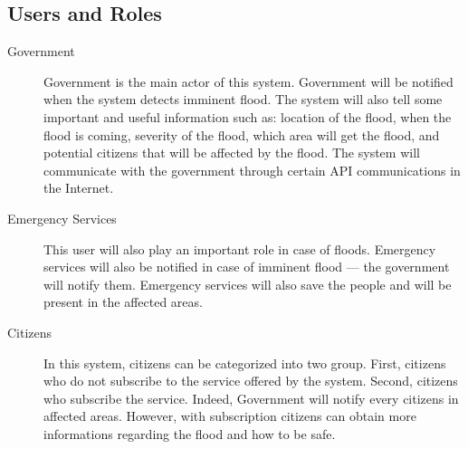 \subsection{Users and Roles}
\begin{description}
	\item[Government] Government is the main actor of this system. Government will be notified when the system detects imminent flood. The system will also tell some important and useful information such as: location of the flood, when the flood is coming, severity of the flood, which area will get the flood, and potential citizens that will be affected by the flood. The system will communicate with the government through certain API communications in the Internet.
	\item[Emergency Services] This user will also play an important role in case of floods. Emergency services will also be notified in case of imminent flood --- the government will notify them. Emergency services will also save the people and will be present in the affected areas.
	\item[Citizens] In this system, citizens can be categorized into two group. First, citizens who do not subscribe to the service offered by the system. Second, citizens who subscribe the service. Indeed, Government will notify every citizens in affected areas. However, with subscription citizens can obtain more informations regarding the flood and how to be safe.
\end{description} 

